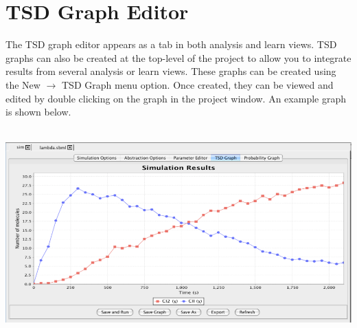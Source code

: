 \documentclass[titlepage,11pt]{article}
\begin{document}
\section{\label{TSDEdit}TSD Graph Editor}

\noindent
The TSD graph editor appears as a tab in both analysis and learn
views.  TSD graphs can also be created at the top-level of the project
to allow you to integrate results from several analysis or learn
views. These graphs can be created using the New $\rightarrow$ TSD Graph
menu option. Once created, they can be viewed and edited by double
clicking on the graph in the project window.  An example graph is
shown below.
\begin{center}
\includegraphics[height=80mm]{screenshots/TSDgraph}
\end{center}
\end{document}
